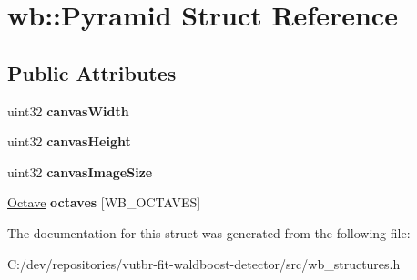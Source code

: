 \hypertarget{structwb_1_1_pyramid}{}\section{wb\+:\+:Pyramid Struct Reference}
\label{structwb_1_1_pyramid}
\subsection*{Public Attributes}
\begin{DoxyCompactItemize}
\item 
\hypertarget{structwb_1_1_pyramid_acc70ceeb48ac9b885ab5d51fbe2e8f3c}{}uint32 {\bfseries canvas\+Width}\label{structwb_1_1_pyramid_acc70ceeb48ac9b885ab5d51fbe2e8f3c}

\item 
\hypertarget{structwb_1_1_pyramid_a64263c90e68fcefbb196988b6d5837da}{}uint32 {\bfseries canvas\+Height}\label{structwb_1_1_pyramid_a64263c90e68fcefbb196988b6d5837da}

\item 
\hypertarget{structwb_1_1_pyramid_a8605f3931016cbc267639b59e8702943}{}uint32 {\bfseries canvas\+Image\+Size}\label{structwb_1_1_pyramid_a8605f3931016cbc267639b59e8702943}

\item 
\hypertarget{structwb_1_1_pyramid_ac36b3371df970a20fc6a403fc03fc4c9}{}\hyperlink{structwb_1_1_octave}{Octave} {\bfseries octaves} \mbox{[}W\+B\+\_\+\+O\+C\+T\+A\+V\+E\+S\mbox{]}\label{structwb_1_1_pyramid_ac36b3371df970a20fc6a403fc03fc4c9}

\end{DoxyCompactItemize}


The documentation for this struct was generated from the following file\+:\begin{DoxyCompactItemize}
\item 
C\+:/dev/repositories/vutbr-\/fit-\/waldboost-\/detector/src/wb\+\_\+structures.\+h\end{DoxyCompactItemize}
